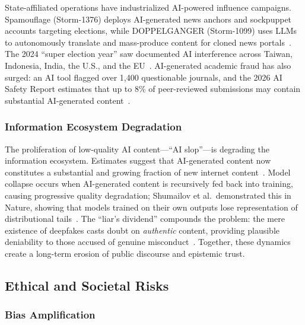 State-affiliated operations have industrialized AI-powered influence campaigns. Spamouflage (Storm-1376) deploys AI-generated news anchors and sockpuppet accounts targeting elections, while DOPPELGANGER (Storm-1099) uses LLMs to autonomously translate and mass-produce content for cloned news portals~\cite{mtac2024elections}. The 2024 ``super election year'' saw documented AI interference across Taiwan, Indonesia, India, the U.S., and the EU~\cite{restofworld2024tracker}. AI-generated academic fraud has also surged: an AI tool flagged over 1,400 questionable journals, and the 2026 AI Safety Report estimates that up to 8\% of peer-reviewed submissions may contain substantial AI-generated content~\cite{sciencedaily2025fakejournals,aisafetyreport2026}.


\subsubsection{Information Ecosystem Degradation}
\label{sec:threat-ecosystem}

The proliferation of low-quality AI content---``AI slop''---is degrading the information ecosystem. Estimates suggest that AI-generated content now constitutes a substantial and growing fraction of new internet content~\cite{graphite2025aicontent}. Model collapse occurs when AI-generated content is recursively fed back into training, causing progressive quality degradation; Shumailov et al.\ demonstrated this in Nature, showing that models trained on their own outputs lose representation of distributional tails~\cite{shumailov2024collapse}. The ``liar's dividend'' compounds the problem: the mere existence of deepfakes casts doubt on \emph{authentic} content, providing plausible deniability to those accused of genuine misconduct~\cite{chesney2019deepfakes}. Together, these dynamics create a long-term erosion of public discourse and epistemic trust.


\subsection{Ethical and Societal Risks}
\label{sec:threat-ethics}

\subsubsection{Bias Amplification}
\label{sec:threat-bias}

